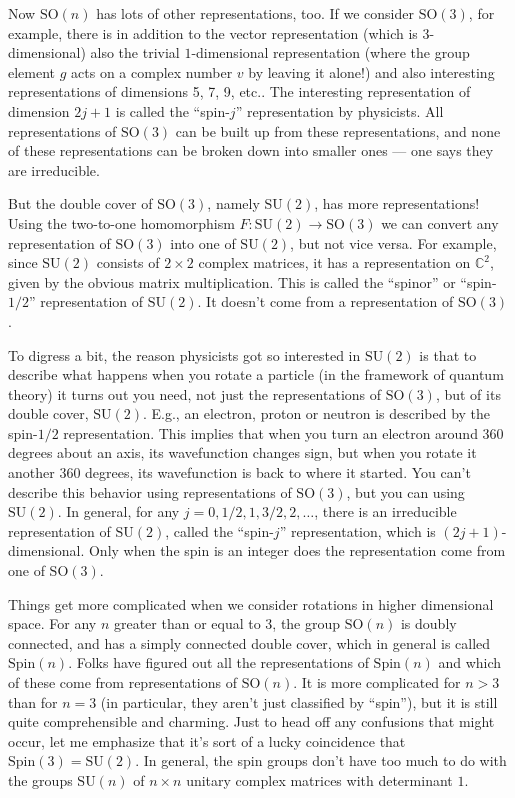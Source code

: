 \documentclass{article}
\begin{document}
Now \(\mathrm{SO}(n)\) has lots of other representations, too. If we
consider \(\mathrm{SO}(3)\), for example, there is in addition to the
vector representation (which is 3-dimensional) also the trivial
\(1\)-dimensional representation (where the group element \(g\) acts on
a complex number \(v\) by leaving it alone!) and also interesting
representations of dimensions 5, 7, 9, etc.. The interesting
representation of dimension \(2j+1\) is called the ``spin-\(j\)''
representation by physicists. All representations of \(\mathrm{SO}(3)\)
can be built up from these representations, and none of these
representations can be broken down into smaller ones --- one says they
are irreducible.

But the double cover of \(\mathrm{SO}(3)\), namely \(\mathrm{SU}(2)\),
has more representations! Using the two-to-one homomorphism
\(F\colon \mathrm{SU}(2) \to \mathrm{SO}(3)\) we can convert any
representation of \(\mathrm{SO}(3)\) into one of \(\mathrm{SU}(2)\), but
not vice versa. For example, since \(\mathrm{SU}(2)\) consists of
\(2\times2\) complex matrices, it has a representation on
\(\mathbb{C}^2\), given by the obvious matrix multiplication. This is
called the ``spinor'' or ``spin-\(1/2\)'' representation of
\(\mathrm{SU}(2)\). It doesn't come from a representation of
\(\mathrm{SO}(3)\).

To digress a bit, the reason physicists got so interested in
\(\mathrm{SU}(2)\) is that to describe what happens when you rotate a
particle (in the framework of quantum theory) it turns out you need, not
just the representations of \(\mathrm{SO}(3)\), but of its double cover,
\(\mathrm{SU}(2)\). E.g., an electron, proton or neutron is described by
the spin-\(1/2\) representation. This implies that when you turn an
electron around 360 degrees about an axis, its wavefunction changes
sign, but when you rotate it another 360 degrees, its wavefunction is
back to where it started. You can't describe this behavior using
representations of \(\mathrm{SO}(3)\), but you can using
\(\mathrm{SU}(2)\). In general, for any
\(j = 0, 1/2, 1, 3/2, 2, \ldots\), there is an irreducible
representation of \(\mathrm{SU}(2)\), called the ``spin-\(j\)''
representation, which is \((2j+1)\)-dimensional. Only when the spin is
an integer does the representation come from one of \(\mathrm{SO}(3)\).

Things get more complicated when we consider rotations in higher
dimensional space. For any \(n\) greater than or equal to 3, the group
\(\mathrm{SO}(n)\) is doubly connected, and has a simply connected
double cover, which in general is called \(\mathrm{Spin}(n)\). Folks
have figured out all the representations of \(\mathrm{Spin}(n)\) and
which of these come from representations of \(\mathrm{SO}(n)\). It is
more complicated for \(n > 3\) than for \(n = 3\) (in particular, they
aren't just classified by ``spin''), but it is still quite
comprehensible and charming. Just to head off any confusions that might
occur, let me emphasize that it's sort of a lucky coincidence that
\(\mathrm{Spin}(3) = \mathrm{SU}(2)\). In general, the spin groups don't
have too much to do with the groups \(\mathrm{SU}(n)\) of \(n\times n\)
unitary complex matrices with determinant \(1\).
\end{document}
